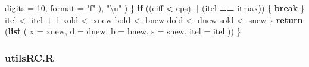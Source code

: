 \documentclass[12pt,]{article}
\newenvironment{Shaded}{\begin{snugshade}}{\end{snugshade}}
\newcommand{\KeywordTok}[1]{\textcolor[rgb]{0.13,0.29,0.53}{\textbf{#1}}}
\newcommand{\DataTypeTok}[1]{\textcolor[rgb]{0.13,0.29,0.53}{#1}}
\newcommand{\DecValTok}[1]{\textcolor[rgb]{0.00,0.00,0.81}{#1}}
\newcommand{\CharTok}[1]{\textcolor[rgb]{0.31,0.60,0.02}{#1}}
\newcommand{\StringTok}[1]{\textcolor[rgb]{0.31,0.60,0.02}{#1}}
\newcommand{\ControlFlowTok}[1]{\textcolor[rgb]{0.13,0.29,0.53}{\textbf{#1}}}
\newcommand{\OperatorTok}[1]{\textcolor[rgb]{0.81,0.36,0.00}{\textbf{#1}}}
\newcommand{\NormalTok}[1]{#1}
\begin{document}
\begin{Shaded}
\begin{Highlighting}[]
            \DataTypeTok{digits =} \DecValTok{10}\NormalTok{,}
            \DataTypeTok{format =} \StringTok{"f"}
\NormalTok{          ),}
          \StringTok{"}\CharTok{\textbackslash{}n}\StringTok{"}
\NormalTok{        )}
\NormalTok{      \}}
      \ControlFlowTok{if}\NormalTok{ ((eiff }\OperatorTok{<}\StringTok{ }\NormalTok{eps) }\OperatorTok{||}\StringTok{ }\NormalTok{(itel }\OperatorTok{==}\StringTok{ }\NormalTok{itmax)) \{}
        \ControlFlowTok{break}
\NormalTok{      \}}
\NormalTok{      itel <-}\StringTok{ }\NormalTok{itel }\OperatorTok{+}\StringTok{ }\DecValTok{1}
\NormalTok{      xold <-}\StringTok{ }\NormalTok{xnew}
\NormalTok{      bold <-}\StringTok{ }\NormalTok{bnew}
\NormalTok{      dold <-}\StringTok{ }\NormalTok{dnew}
\NormalTok{      sold <-}\StringTok{ }\NormalTok{snew}
\NormalTok{    \}}
    \KeywordTok{return}\NormalTok{ (}\KeywordTok{list}\NormalTok{ (}
      \DataTypeTok{x =}\NormalTok{ xnew,}
      \DataTypeTok{d =}\NormalTok{ dnew,}
      \DataTypeTok{b =}\NormalTok{ bnew,}
      \DataTypeTok{s =}\NormalTok{ snew,}
      \DataTypeTok{itel =}\NormalTok{ itel}
\NormalTok{    ))}
\NormalTok{  \}}
\end{Highlighting}
\end{Shaded}

\subsubsection{utilsRC.R}\label{utilsrc.r}
\end{document}
